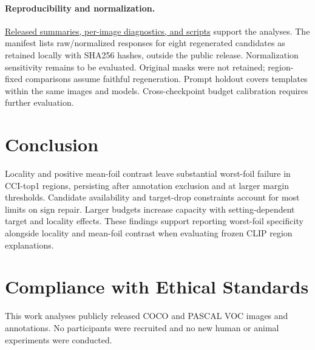\documentclass[10pt]{article}
\begin{document}
\paragraph{Reproducibility and normalization.}
\href{https://github.com/jovial-liu/conway/tree/paper/verified-rerun-integration/experiments}{Released summaries, per-image diagnostics, and scripts} support the analyses.
The manifest lists raw/normalized responses for eight regenerated candidates
as retained locally with SHA256 hashes, outside the public release.
Normalization sensitivity remains to be evaluated. Original masks were not
retained; region-fixed comparisons assume faithful regeneration. Prompt
holdout covers templates within the same images and models. Cross-checkpoint
budget calibration requires further evaluation.

\section{Conclusion}
Locality and positive mean-foil contrast leave substantial worst-foil failure
in CCI-top1 regions, persisting after annotation exclusion and at larger
margin thresholds. Candidate availability and target-drop constraints
account for most limits on sign repair. Larger budgets increase capacity
with setting-dependent target and locality effects. These findings support
reporting worst-foil specificity alongside locality and mean-foil contrast
when evaluating frozen CLIP region explanations.

\clearpage
\balance

\section*{Compliance with Ethical Standards}
This work analyses publicly released COCO and PASCAL VOC images and
annotations. No participants were recruited and no new human or animal
experiments were conducted.
\end{document}
